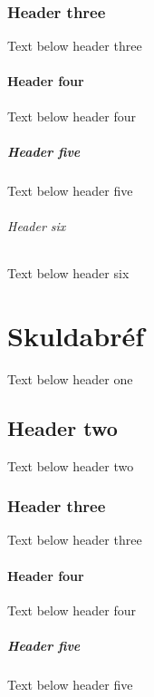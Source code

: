 \documentclass[a4paper,10pt,icelandic]{sphinxmanual}
\begin{document}
\subsection{Header three}
\label{\detokenize{ahaetta-og-avoxtun/index:header-three}}
\sphinxAtStartPar
Text below header three


\subsubsection{Header four}
\label{\detokenize{ahaetta-og-avoxtun/index:header-four}}
\sphinxAtStartPar
Text below header four


\paragraph{Header five}
\label{\detokenize{ahaetta-og-avoxtun/index:header-five}}
\sphinxAtStartPar
Text below header five


\subparagraph{Header six}
\label{\detokenize{ahaetta-og-avoxtun/index:header-six}}
\sphinxAtStartPar
Text below header six

\sphinxstepscope


\chapter{Skuldabréf}
\label{\detokenize{skuldabref/index:skuldabref}}\label{\detokenize{skuldabref/index::doc}}
\sphinxAtStartPar
Text below header one


\section{Header two}
\label{\detokenize{skuldabref/index:header-two}}
\sphinxAtStartPar
Text below header two


\subsection{Header three}
\label{\detokenize{skuldabref/index:header-three}}
\sphinxAtStartPar
Text below header three


\subsubsection{Header four}
\label{\detokenize{skuldabref/index:header-four}}
\sphinxAtStartPar
Text below header four


\paragraph{Header five}
\label{\detokenize{skuldabref/index:header-five}}
\sphinxAtStartPar
Text below header five
\end{document}
